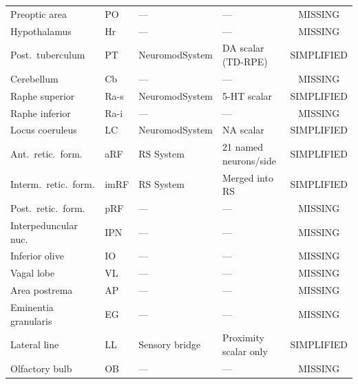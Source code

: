 \documentclass[11pt,a4paper]{article}
\begin{document}
\begin{longtable}{@{}llllc@{}}
Preoptic area        & PO   & ---            & ---                              & \textcolor{missing}{MISSING}       \\
Hypothalamus         & Hr   & ---            & ---                              & \textcolor{missing}{MISSING}       \\
Post.\ tuberculum    & PT   & NeuromodSystem & DA scalar (TD-RPE)               & \textcolor{simplified}{SIMPLIFIED} \\
Cerebellum           & Cb   & ---            & ---                              & \textcolor{missing}{MISSING}       \\
Raphe superior       & Ra-s & NeuromodSystem & 5-HT scalar                      & \textcolor{simplified}{SIMPLIFIED} \\
Raphe inferior       & Ra-i & ---            & ---                              & \textcolor{missing}{MISSING}       \\
Locus coeruleus      & LC   & NeuromodSystem & NA scalar                        & \textcolor{simplified}{SIMPLIFIED} \\
Ant.\ retic.\ form.  & aRF  & RS System      & 21 named neurons/side            & \textcolor{simplified}{SIMPLIFIED} \\
Interm.\ retic.\ form. & imRF & RS System    & Merged into RS                   & \textcolor{simplified}{SIMPLIFIED} \\
Post.\ retic.\ form. & pRF  & ---            & ---                              & \textcolor{missing}{MISSING}       \\
Interpeduncular nuc. & IPN  & ---            & ---                              & \textcolor{missing}{MISSING}       \\
Inferior olive       & IO   & ---            & ---                              & \textcolor{missing}{MISSING}       \\
Vagal lobe           & VL   & ---            & ---                              & \textcolor{missing}{MISSING}       \\
Area postrema        & AP   & ---            & ---                              & \textcolor{missing}{MISSING}       \\
Eminentia granularis & EG   & ---            & ---                              & \textcolor{missing}{MISSING}       \\
Lateral line         & LL   & Sensory bridge & Proximity scalar only            & \textcolor{simplified}{SIMPLIFIED} \\
Olfactory bulb       & OB   & ---            & ---                              & \textcolor{missing}{MISSING}       \\

\end{longtable}
\end{document}
